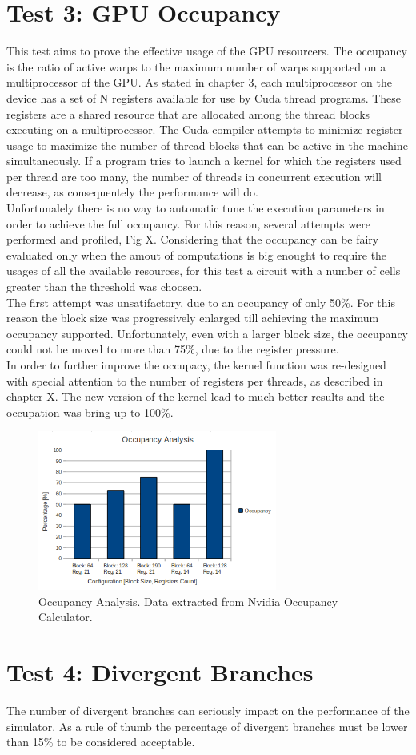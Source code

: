\section{Test 3: GPU Occupancy}
This test aims to prove the effective usage of the GPU resourcers. The occupancy is the ratio of active warps to the maximum number of warps supported on a multiprocessor of the GPU. As stated in chapter 3, each multiprocessor on the device has a set of N registers available for use by Cuda thread programs. These registers are a shared resource that are allocated among the thread blocks executing on a multiprocessor. The Cuda compiler attempts to minimize register usage to maximize the number of thread blocks that can be active in the machine simultaneously. If a program tries to launch a kernel for which the registers used per thread are too many, the number of threads in concurrent execution will decrease, as consequentely the performance will do.\\
Unfortunalely there is no way to automatic tune the execution parameters in order to achieve the full occupancy. For this reason, several attempts were performed and profiled, Fig X. Considering that the occupancy can be fairy evaluated only when the amout of computations is big enought to require the usages of all the available resources, for this test a circuit with a number of cells greater than the threshold was choosen.\\ 
The first attempt was unsatifactory, due to an occupancy of only 50\%. For this reason the block size was progressively enlarged till achieving the maximum occupancy supported. Unfortunately, even with a larger block size, the occupancy could not be moved to more than 75\%, due to the register pressure.\\
In order to further improve the occupacy, the kernel function was re-designed with special attention to the number of registers per threads, as described in chapter X. The new version of the kernel lead to much better results and the occupation was bring up to 100\%.
    
\begin{figure}[h!bt]
        \centerline{\includegraphics[width=0.7\textwidth]{img/OccupancyAnalysis.png}}
        \caption{Occupancy Analysis. Data extracted from Nvidia Occupancy Calculator.}
        \label{fig:OccupancyAnalysis}
\end{figure}

\section{Test 4: Divergent Branches}
The number of divergent branches can seriously impact on the performance of the simulator. As a rule of thumb the percentage of divergent branches must be lower than 15\% to be considered acceptable. 


